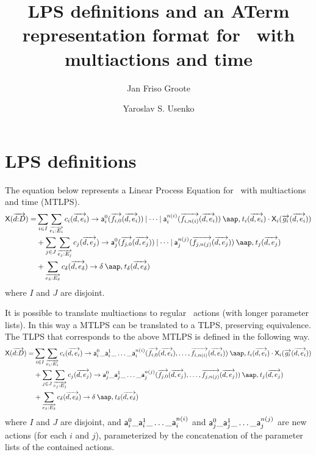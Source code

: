 \documentclass[fleqn,a4paper,dvips]{article}
\title{LPS definitions and an ATerm representation format for \mcrl\
  with multiactions and time}
\author{Jan Friso Groote \and Yaroslav S. Usenko}
\begin{document}
\maketitle
\tableofcontents

\section{LPS definitions}

The equation below represents a Linear Process Equation for \mcrl\
with multiactions and time (MTLPS).
\begin{gather}
\begin{split}
\pr{X}(\vect{d\ap D})=&\sum_{i\in I}\sum_{\vect{e_i\ap E_i}} c_i(\vect{d,e_i})\to\act{a}^0_i(\vect{f_{i,0}}(\vect{d,e_i}))\comm\dots\comm\act{a}^{n(i)}_i(\vect{f_{i,n(i)}}(\vect{d,e_i}))\at t_i(\vect{d,e_i})\seqc
\pr{X}_i(\vect{g_i}(\vect{d,e_i}))\notag\\
&+\sum_{j\in J}\sum_{\vect{e_j\ap E_j}} c_j(\vect{d,e_j})\to\act{a}^0_j(\vect{f_{j,0}}(\vect{d,e_j}))\comm\dots\comm\act{a}^{n(j)}_j(\vect{f_{j,n(j)}}(\vect{d,e_j}))\at t_j(\vect{d,e_j})\\
&+\sum_{\vect{e_\delta\ap E_\delta}} c_\delta(\vect{d,e_\delta})\to\delta\at t_\delta(\vect{d,e_\delta})
\end{split}
\end{gather}
where $I$ and $J$ are disjoint.

It is possible to translate multiactions to regular \mcrl\ actions
(with longer parameter lists).  In this way a MTLPS can be translated
to a TLPS, preserving equivalence.  The TLPS that corresponds to the
above MTLPS is defined in the following way.
\begin{gather}
\begin{split}
\pr{X}(\vect{d\ap D})=&\sum_{i\in I}\sum_{\vect{e_i\ap E_i}} c_i(\vect{d,e_i})\to\act{a}^0_i\_\act{a}^1_i\_\dots\_\act{a}^{n(i)}_i(\vect{f_{i,0}}(\vect{d,e_i}),\dots,\vect{f_{i,n(i)}}(\vect{d,e_i}))\at t_i(\vect{d,e_i})\seqc
\pr{X}_i(\vect{g_i}(\vect{d,e_i}))\notag\\
&+\sum_{j\in J}\sum_{\vect{e_j\ap E_j}} c_j(\vect{d,e_j})\to\act{a}^0_j\_\act{a}^1_j\_\dots\_\act{a}^{n(j)}_j(\vect{f_{j,0}}(\vect{d,e_j}),\dots,\vect{f_{j,n(j)}}(\vect{d,e_j}))\at t_j(\vect{d,e_j})\\
&+\sum_{\vect{e_\delta\ap E_\delta}} c_\delta(\vect{d,e_\delta})\to\delta\at t_\delta(\vect{d,e_\delta})
\end{split}
\end{gather}
where $I$ and $J$ are disjoint, and
$\mathsf{a}^0_i\_\mathsf{a}^1_i\_\dots\_\mathsf{a}^{n(i)}_i$ and
$\mathsf{a}^0_j\_\mathsf{a}^1_j\_\dots\_\mathsf{a}^{n(j)}_j$ are new actions
(for each $i$ and $j$), parameterized by the concatenation of the
parameter lists of the contained actions.
\end{document}
